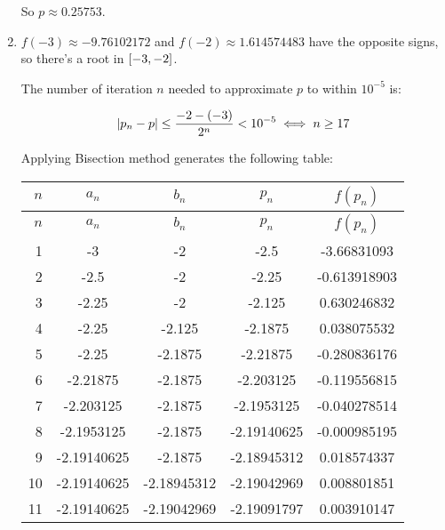 \documentclass[../../Assignments.tex]{subfiles}
\begin{document}
\begin{solution}
\begin{enumerate}[label = (\alph*)]
            So \(p \approx \num{0.25753}\).

        \item \(f(-3) \approx \num{-9.76102172}\) and \(f(-2) \approx
            \num{1.614574483}\) have the opposite signs, so there's a root in
            \(\interval{-3}{-2}\).

            The number of iteration \(n\) needed to approximate \(p\) to within
            \(10^{-5}\) is:

            \[\abs{p_n - p} \leq \frac{-2 - (-3)}{2^n} < 10^{-5} \iff n \geq 17\]

            Applying Bisection method generates the following table:

            \begin{longtable}{r S[table-format=-1.8] S[table-format=-1.8] S[table-format=-1.8] S[table-format=-1.9]}
                \toprule
                \(n\)  &   {\(a_n\)}   &   {\(b_n\)}   &   {\(p_n\)}   &  {\(f(p_n)\)}  \\
                \midrule
                \endfirsthead
                \(n\)  &   {\(a_n\)}   &   {\(b_n\)}   &   {\(p_n\)}   &  {\(f(p_n)\)}  \\
                \midrule
                  &  -3           &  -2           &  -2.5         &  -3.66831093   \\
                    2  &  -2.5         &  -2           &  -2.25        &  -0.613918903  \\
                    3  &  -2.25        &  -2           &  -2.125       &   0.630246832  \\
                    4  &  -2.25        &  -2.125       &  -2.1875      &   0.038075532  \\
                    5  &  -2.25        &  -2.1875      &  -2.21875     &  -0.280836176  \\
                    6  &  -2.21875     &  -2.1875      &  -2.203125    &  -0.119556815  \\
                    7  &  -2.203125    &  -2.1875      &  -2.1953125   &  -0.040278514  \\
                    8  &  -2.1953125   &  -2.1875      &  -2.19140625  &  -0.000985195  \\
                    9  &  -2.19140625  &  -2.1875      &  -2.18945312  &   0.018574337  \\
                   10  &  -2.19140625  &  -2.18945312  &  -2.19042969  &   0.008801851  \\
                   11  &  -2.19140625  &  -2.19042969  &  -2.19091797  &   0.003910147  \\

\end{longtable}
\end{enumerate}
\end{solution}
\end{document}
